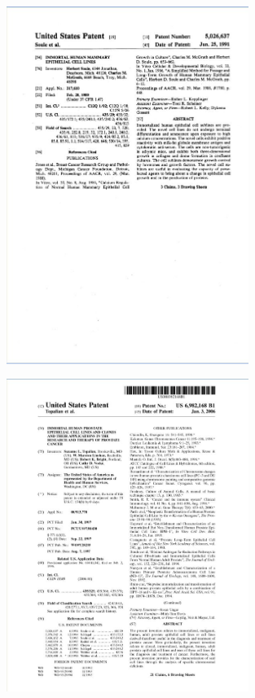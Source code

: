 \begin{figure}[H]
	\centering
	\includegraphics[width=0.7\textwidth]{daten/pics/patent1.jpg}
\end{figure}

\begin{figure}[H]
	\centering
	\includegraphics[width=0.7\textwidth]{daten/pics/patent2.jpg}
\end{figure}

